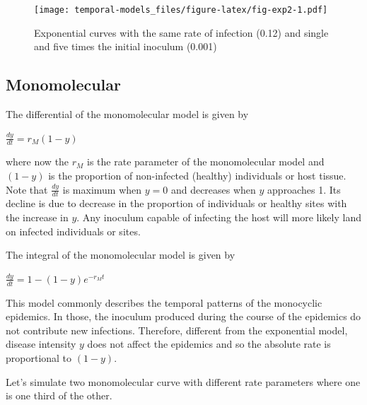 \documentclass[
  letterpaper,
]{book}
\begin{document}
\begin{figure}

{\centering \texttt{[image: temporal-models\_files/figure-latex/fig-exp2-1.pdf]}

}

\caption{\label{fig-exp2}Exponential curves with the same rate of
infection (0.12) and single and five times the initial inoculum (0.001)}

\end{figure}

\hypertarget{monomolecular}{%
\subsection{Monomolecular}\label{monomolecular}}

The differential of the monomolecular model is given by

\(\frac{dy}{dt} = r_M (1-y)\)

where now the \(r_M\) is the rate parameter of the monomolecular model
and \((1-y)\) is the proportion of non-infected (healthy) individuals or
host tissue. Note that \(\frac{dy}{dt}\) is maximum when \(y = 0\) and
decreases when \(y\) approaches 1. Its decline is due to decrease in the
proportion of individuals or healthy sites with the increase in \(y\).
Any inoculum capable of infecting the host will more likely land on
infected individuals or sites.

The integral of the monomolecular model is given by

\(\frac{dy}{dt} = 1 - (1-y)e^{-r_Mt}\)

This model commonly describes the temporal patterns of the monocyclic
epidemics. In those, the inoculum produced during the course of the
epidemics do not contribute new infections. Therefore, different from
the exponential model, disease intensity \(y\) does not affect the
epidemics and so the absolute rate is proportional to \((1-y)\).

Let's simulate two monomolecular curve with different rate parameters
where one is one third of the other.
\end{document}
